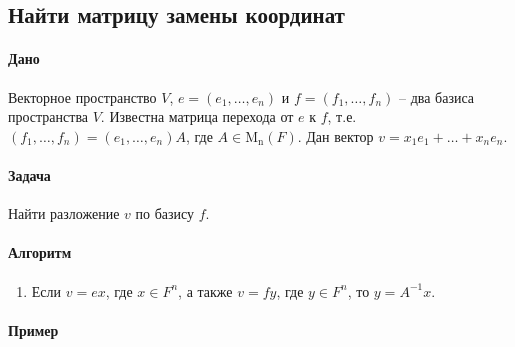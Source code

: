 \documentclass{article}
\newcommand{\Matrix}[2]{\operatorname{\mathrm{M}_{#2}}(#1)}
\begin{document}
\subsection{Найти матрицу замены координат}

\paragraph{Дано}

Векторное пространство $V$, $e=(e_1,\ldots,e_n)$ и $f = (f_1,\ldots,f_n)$ -- два базиса пространства $V$.
Известна матрица перехода от $e$ к $f$, т.е. $(f_1,\ldots,f_n) = (e_1,\ldots,e_n)A$, где $A\in \Matrix{F}{n}$.
Дан вектор $v = x_1e_1+\ldots+x_n e_n$.

\paragraph{Задача}

Найти разложение $v$ по  базису $f$.

\paragraph{Алгоритм}

\begin{enumerate}
\item Если $v = e x$, где $x\in F^{n}$, а также $v = f y$, где $y\in F^{n}$, то $y = A^{-1}x$.
\end{enumerate}

\paragraph{Пример}
\end{document}
